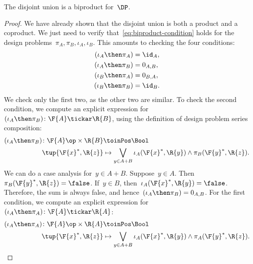 \begin{lemma}
The disjoint union is a biproduct for~$\DP$.
\end{lemma}
\begin{proof}
    We have already shown that the disjoint union is both
    a product and a coproduct. We just need to verify that~\cref{eq:biproduct-condition} holds
    for the design problems~$\pi_A, \pi_B, \iota_A, \iota_B$.
    This amounts to checking the four conditions:
    \begin{equation}
    \begin{aligned}
        (\iota_A\then \pi_A) &= \id_{A}, \\
        (\iota_A\then \pi_B) &= 0_{A,B}, \\
        (\iota_B\then \pi_A) &= 0_{B,A},\\
        (\iota_B\then \pi_B) &= \id_{B}.
    \end{aligned}
    \end{equation}
    We check only the first two, as the other two are similar.
    To check the second condition, we compute an explicit expression for~$(\iota_A\then \pi_B)\colon \F{A} \tickar \R{B}$, using the definition
    of design problem series composition:
    \begin{equation}
    \begin{aligned}
        (\iota_A\then \pi_B) \colon  \F{A}\op\times \R{B} & \toinPos \Bool \\
        \tup{\F{x}^*, \R{z}} &\mapsto
        \bigvee_{y \in A + B} \iota_A(\F{x}^*,\R{y}) \wedge \pi_B(\F{y}^*,\R{z}).
    \end{aligned}
    \end{equation}
    We can do a case analysis for~$y\in A+B$. Suppose~$y\in A$.
    Then~$\pi_B(\F{y}^*,\R{z}) = \false$. If~$y \in B$, then~$\iota_A(\F{x}^*,\R{y}) = \false$.
    Therefore, the sum is always false, and hence~$(\iota_A\then \pi_B) = 0_{A,B}$.
    For the first condition, we compute  an explicit expression for~$(\iota_A\then \pi_A) \colon \F{A} \tickar \R{A}$:
    \begin{equation}
    \begin{aligned}
        (\iota_A\then \pi_A) \colon  \F{A}\op\times \R{A} & \toinPos \Bool \\
        \tup{\F{x}^*, \R{z}} &\mapsto
        \bigvee_{y \in A + B} \iota_A(\F{x}^*,\R{y}) \wedge \pi_A(\F{y}^*,\R{z}).
    \end{aligned}
    \end{equation}

\end{proof}
